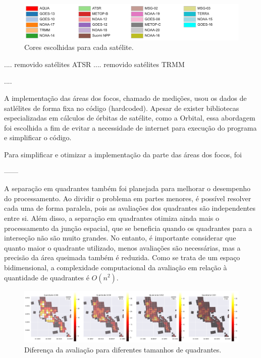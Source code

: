 \documentclass[cic,tc]{iiufrgs}
\begin{document}
\begin{figure}[H]
    \caption{Cores escolhidas para cada satélite.}
    \begin{center}
        \includegraphics[width=35em]{cores_satelites}
    \end{center}
    \label{fig:cores_satelites}
\end{figure}


.... removido satélites ATSR .... removido satélites TRMM



....

A implementação das áreas dos focos, chamado de medições, usou os dados de satlélites de forma fixa no código (hardcoded). Apesar de exister bibliotecas especializadas em cálculos de órbitas de satélite, como a Orbital, essa abordagem foi escolhida a fim de evitar a necessidade de internet para execução do programa e simplificar o código. \par

Para simplificar e otimizar a implementação da parte das áreas dos focos, foi\par

------

A separação em quadrantes também foi planejada para melhorar o desempenho do processamento. Ao dividir o problema em partes menores, é possível resolver cada uma de forma paralela, pois as avaliações dos quadrantes são independentes entre si. Além disso, a separação em quadrantes otimiza ainda mais o processamento da junção espacial, que se beneficia quando os quadrantes para a interseção não são muito grandes. No entanto, é importante considerar que quanto maior o quadrante utilizado, menos avaliações são necessárias, mas a precisão da área queimada também é reduzida. Como se trata de um espaço bidimensional, a complexidade computacional da avaliação em relação à quantidade de quadrantes é $O(n^2)$. \par

\begin{figure}[H]
    \caption{Diferença da avaliação para diferentes tamanhos de quadrantes.}
    \begin{center}
        \includegraphics[width=35em]{diferenca_entre_quadrantes}
    \end{center}
    \label{fig:diferenca_entre_quadrantes}
\end{figure}
\end{document}
